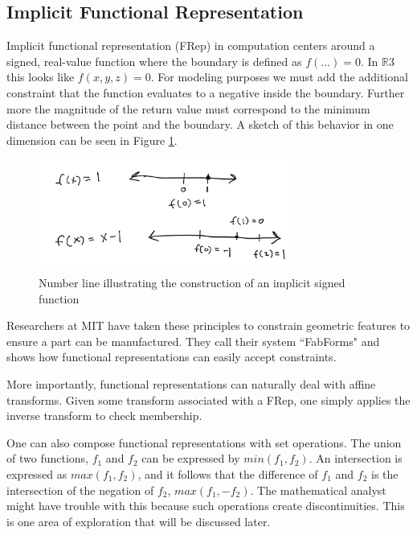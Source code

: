 \documentclass[a4paper]{article}
\begin{document}
\subsection{Implicit Functional Representation}

Implicit functional representation (FRep) in computation centers around a signed, real-value
function where the boundary is defined as $f(...) = 0$.
In $\mathbb{R}3$ this looks like $f(x,y,z) = 0$. For modeling purposes we must add the
additional constraint that the function evaluates to a negative inside the
boundary. Further more the magnitude of the return value must correspond to
the minimum distance between the point and the boundary.\cite{Olah_2011}
A sketch of this behavior in one dimension
can be seen in Figure \ref{fig:implicit-sketch}.

\begin{figure}[h!]
  \centering
    \includegraphics[width=0.75\textwidth]{img/implicit_sketch.png}
  \caption{Number line illustrating the construction of an implicit signed function}
  \label{fig:implicit-sketch}
\end{figure}

Researchers at MIT have taken these principles to constrain
geometric features to ensure a part can be manufactured.\cite{Shugrina_Shamir_Matusik_2015}
They call their system ``FabForms" and shows how functional representations
can easily accept constraints.

More importantly, functional representations can naturally deal with affine
transforms. \cite{Henderson_2002} Given some transform associated with a
FRep, one simply applies the inverse transform to check membership.

One can also compose functional representations with set operations. The union
of two functions, $f_1$ and $f_2$ can be expressed by $min(f_1,f_2)$. An
intersection is expressed as $max(f_1,f_2)$, and it follows that the difference
of $f_1$ and $f_2$ is the intersection of the negation of $f_2$, $max(f_1,-f_2)$.
The mathematical analyst might have trouble with this because such operations
create discontinuities. This is one area of exploration that will be discussed
later.
\end{document}
